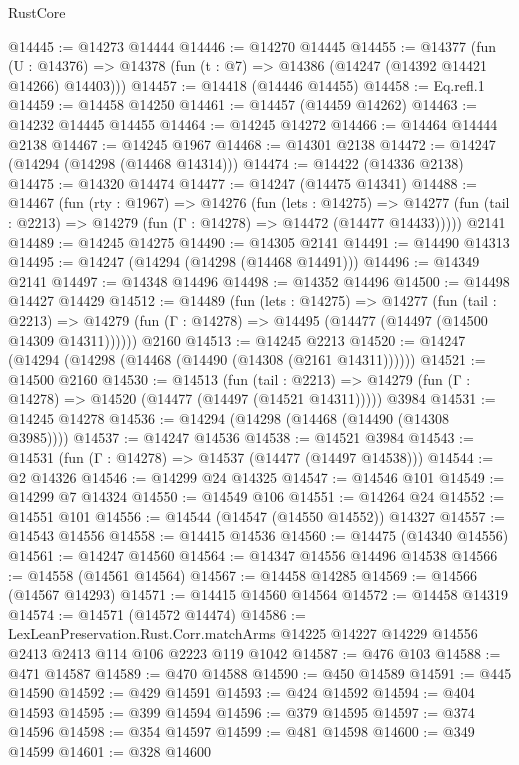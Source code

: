 \begin{lexlean}{RustCore}
\begin{coremodule}
@14445 := @14273 @14444
@14446 := @14270 @14445
@14455 := @14377
    (fun (U : @14376) => @14378 (fun (t : @7) => @14386 (@14247 (@14392 @14421 @14266) @14403)))
@14457 := @14418 (@14446 @14455)
@14458 := Eq.refl.{1}
@14459 := @14458 @14250
@14461 := @14457 (@14459 @14262)
@14463 := @14232 @14445 @14455
@14464 := @14245 @14272
@14466 := @14464 @14444 @2138
@14467 := @14245 @1967
@14468 := @14301 @2138
@14472 := @14247 (@14294 (@14298 (@14468 @14314)))
@14474 := @14422 (@14336 @2138)
@14475 := @14320 @14474
@14477 := @14247 (@14475 @14341)
@14488 := @14467
    (fun (rty : @1967) =>
    @14276
      (fun (lets : @14275) =>
      @14277 (fun (tail : @2213) => @14279 (fun (Γ : @14278) => @14472 (@14477 @14433)))))
    @2141
@14489 := @14245 @14275
@14490 := @14305 @2141
@14491 := @14490 @14313
@14495 := @14247 (@14294 (@14298 (@14468 @14491)))
@14496 := @14349 @2141
@14497 := @14348 @14496
@14498 := @14352 @14496
@14500 := @14498 @14427 @14429
@14512 := @14489
    (fun (lets : @14275) =>
    @14277
      (fun (tail : @2213) =>
      @14279 (fun (Γ : @14278) => @14495 (@14477 (@14497 (@14500 @14309 @14311))))))
    @2160
@14513 := @14245 @2213
@14520 := @14247 (@14294 (@14298 (@14468 (@14490 (@14308 (@2161 @14311))))))
@14521 := @14500 @2160
@14530 := @14513
    (fun (tail : @2213) => @14279 (fun (Γ : @14278) => @14520 (@14477 (@14497 (@14521 @14311)))))
    @3984
@14531 := @14245 @14278
@14536 := @14294 (@14298 (@14468 (@14490 (@14308 @3985))))
@14537 := @14247 @14536
@14538 := @14521 @3984
@14543 := @14531 (fun (Γ : @14278) => @14537 (@14477 (@14497 @14538)))
@14544 := @2 @14326
@14546 := @14299 @24 @14325
@14547 := @14546 @101
@14549 := @14299 @7 @14324
@14550 := @14549 @106
@14551 := @14264 @24
@14552 := @14551 @101
@14556 := @14544 (@14547 (@14550 @14552)) @14327
@14557 := @14543 @14556
@14558 := @14415 @14536
@14560 := @14475 (@14340 @14556)
@14561 := @14247 @14560
@14564 := @14347 @14556 @14496 @14538
@14566 := @14558 (@14561 @14564)
@14567 := @14458 @14285
@14569 := @14566 (@14567 @14293)
@14571 := @14415 @14560 @14564
@14572 := @14458 @14319
@14574 := @14571 (@14572 @14474)
@14586 := LexLeanPreservation.Rust.Corr.matchArms
    @14225
    @14227
    @14229
    @14556
    @2413
    @2413
    @114
    @106
    @2223
    @119
    @1042
@14587 := @476 @103
@14588 := @471 @14587
@14589 := @470 @14588
@14590 := @450 @14589
@14591 := @445 @14590
@14592 := @429 @14591
@14593 := @424 @14592
@14594 := @404 @14593
@14595 := @399 @14594
@14596 := @379 @14595
@14597 := @374 @14596
@14598 := @354 @14597
@14599 := @481 @14598
@14600 := @349 @14599
@14601 := @328 @14600

\end{coremodule}
\end{lexlean}
